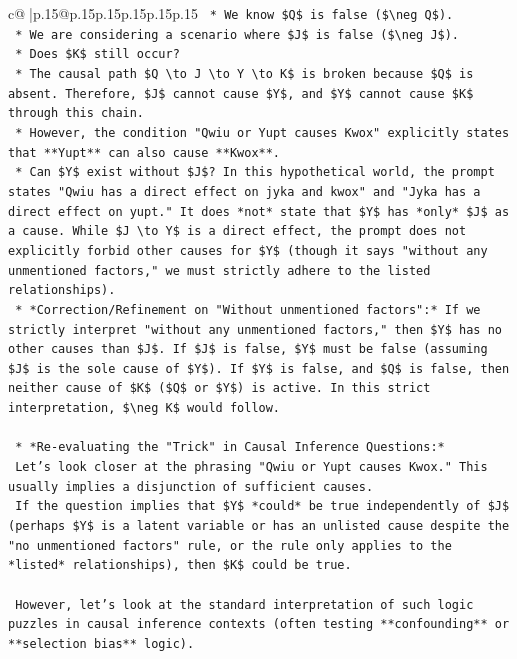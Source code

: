 \documentclass{article}
\begin{document}
{\begin{supertabular}{c@{$\;$}|p{.15\linewidth}@{}p{.15\linewidth}p{.15\linewidth}p{.15\linewidth}p{.15\linewidth}p{.15\linewidth}}
{{{\texttt{    *   We know \$Q\$ is false (\$\textbackslash{}neg Q\$).} \\
\texttt{    *   We are considering a scenario where \$J\$ is false (\$\textbackslash{}neg J\$).} \\
\texttt{    *   Does \$K\$ still occur?} \\
\texttt{        *   The causal path \$Q \textbackslash{}to J \textbackslash{}to Y \textbackslash{}to K\$ is broken because \$Q\$ is absent. Therefore, \$J\$ cannot cause \$Y\$, and \$Y\$ cannot cause \$K\$ through this chain.} \\
\texttt{        *   However, the condition "Qwiu or Yupt causes Kwox" explicitly states that **Yupt** can also cause **Kwox**.} \\
\texttt{        *   Can \$Y\$ exist without \$J\$? In this hypothetical world, the prompt states "Qwiu has a direct effect on jyka and kwox" and "Jyka has a direct effect on yupt." It does *not* state that \$Y\$ has *only* \$J\$ as a cause. While \$J \textbackslash{}to Y\$ is a direct effect, the prompt does not explicitly forbid other causes for \$Y\$ (though it says "without any unmentioned factors," we must strictly adhere to the listed relationships).} \\
\texttt{        *   *Correction/Refinement on "Without unmentioned factors":* If we strictly interpret "without any unmentioned factors," then \$Y\$ has no other causes than \$J\$. If \$J\$ is false, \$Y\$ must be false (assuming \$J\$ is the sole cause of \$Y\$). If \$Y\$ is false, and \$Q\$ is false, then neither cause of \$K\$ (\$Q\$ or \$Y\$) is active. In this strict interpretation, \$\textbackslash{}neg K\$ would follow.} \\
\\ 
\texttt{    *   *Re{-}evaluating the "Trick" in Causal Inference Questions:*} \\
\texttt{        Let's look closer at the phrasing "Qwiu or Yupt causes Kwox." This usually implies a disjunction of sufficient causes.} \\
\texttt{        If the question implies that \$Y\$ *could* be true independently of \$J\$ (perhaps \$Y\$ is a latent variable or has an unlisted cause despite the "no unmentioned factors" rule, or the rule only applies to the *listed* relationships), then \$K\$ could be true.} \\
\\ 
\texttt{        However, let's look at the standard interpretation of such logic puzzles in causal inference contexts (often testing **confounding** or **selection bias** logic).} \\
}}}
\end{supertabular}}
\end{document}
